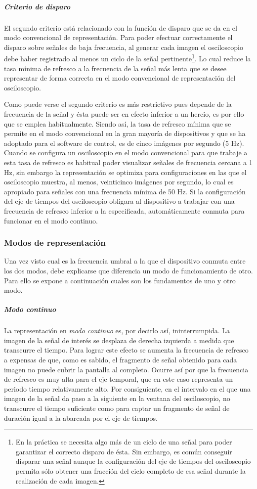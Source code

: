 \subparagraph{Criterio de disparo}

El segundo criterio está relacionado con la función de disparo que se da en
el modo convencional de representación. Para poder efectuar correctamente
el disparo sobre señales de baja frecuencia, al generar cada imagen el
osciloscopio debe haber registrado al menos un ciclo de la señal
pertinente\footnote{En la práctica se necesita algo más de un ciclo de una
señal para poder garantizar el correcto disparo de ésta. Sin embargo, es
común conseguir disparar una señal aunque la configuración del eje de
tiempos del osciloscopio permita sólo obtener una fracción del ciclo
completo de esa señal durante la realización de cada imagen.}. Lo cual
reduce la tasa mínima de refresco a la frecuencia de la señal más lenta que
se desee representar de forma correcta en el modo convencional de
representación del osciloscopio.

Como puede verse el segundo criterio es más restrictivo pues depende de la
frecuencia de la señal y ésta puede ser en efecto inferior a un hercio, es
por ello que se emplea habitualmente. Siendo así, la tasa de refresco
mínima que se permite en el modo convencional en la gran mayoría de
dispositivos y que se ha adoptado para el software de control, es de cinco
imágenes por segundo (5 Hz). Cuando se configura un osciloscopio en el modo
convencional para que trabaje a esta tasa de refresco es habitual poder
visualizar señales de frecuencia cercana a 1 Hz, sin embargo la
representación se optimiza para configuraciones en las que el osciloscopio
muestra, al menos, veinticinco imágenes por segundo, lo cual es apropiado
para señales con una frecuencia mínima de 50 Hz. Si la configuración del
eje de tiempos del osciloscopio obligara al dispositivo a trabajar con una
frecuencia de refresco inferior a la especificada, automáticamente conmuta
para funcionar en el modo continuo.


\subsubsection{Modos de representación}

Una vez visto cual es la frecuencia umbral a la que el dispositivo conmuta
entre los dos modos, debe explicarse que diferencia un modo de
funcionamiento de otro. Para ello se expone a continuación cuales son los
fundamentos de uno y otro modo.


\subparagraph{Modo continuo}

La representación en \emph{modo continuo} es, por decirlo así,
ininterrumpida. La imagen de la señal de interés se desplaza de derecha
izquierda a medida que transcurre el tiempo. Para lograr este efecto se
aumenta la frecuencia de refresco a expensas de que, como es sabido, el
fragmento de señal obtenido para cada imagen no puede cubrir la pantalla al
completo. Ocurre así por que la frecuencia de refresco es muy alta para el
eje temporal, que en este caso representa un periodo tiempo relativamente
alto. Por consiguiente, en el intervalo en el que una imagen de la señal da
paso a la siguiente en la ventana del osciloscopio, no transcurre el tiempo
suficiente como para captar un fragmento de señal de duración igual a la
abarcada por el eje de tiempos.

